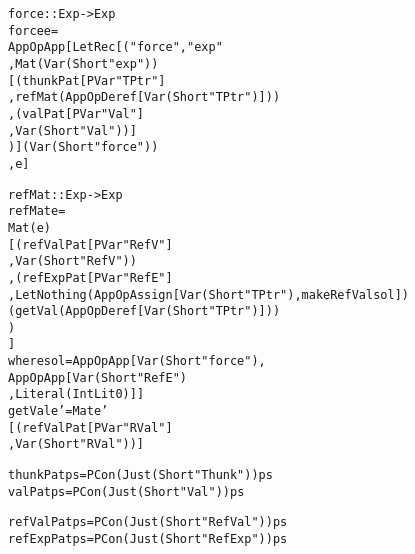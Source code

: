 \begin{alltt}
\newpage
force :: Exp -> Exp
force e =
  App OpApp [LetRec [("force", "exp"
                     , Mat (Var (Short "exp"))
                       [(thunkPat [PVar "TPtr"]
                        ,refMat (App OpDeref [Var (Short "TPtr")]))
                       ,(valPat [PVar "Val"]
                        , Var (Short "Val"))]
                     )] (Var (Short "force"))
            , e]

refMat :: Exp -> Exp
refMat e =
  Mat (e)
  [(refValPat [PVar "RefV"]
   ,Var (Short "RefV"))
  ,(refExpPat [PVar "RefE"]
   ,Let Nothing (App OpAssign [Var (Short "TPtr"), makeRefVal sol])
     (getVal (App OpDeref [Var (Short "TPtr")]))
   )
  ]
  where sol = App OpApp [Var (Short "force"),
                         App OpApp [Var (Short "RefE")
                                   ,Literal (IntLit 0)]]
        getVal e' = Mat e'
                    [(refValPat [PVar "RVal"]
                     ,Var (Short "RVal"))]

thunkPat ps = PCon (Just (Short "Thunk")) ps
valPat   ps = PCon (Just (Short "Val"))   ps

refValPat ps = PCon (Just (Short "RefVal")) ps
refExpPat ps = PCon (Just (Short "RefExp")) ps

\end{alltt}
